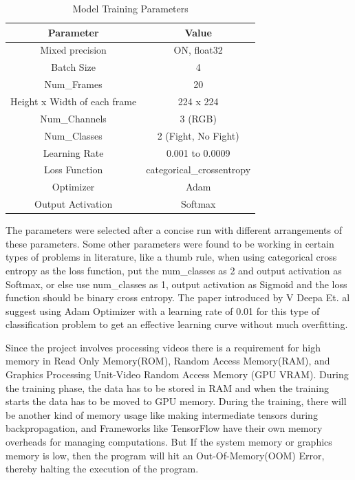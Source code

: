 \begin{table}[!htbp]
\centering
\caption{Model Training Parameters}
\begin{tabular}{c|c}
\hline
\textbf{Parameter}             & \textbf{Value}                 \\ \hline
Mixed precision                & ON, float32                    \\ 
Batch Size                     & 4                              \\ 
Num\_Frames                    & 20                             \\ 
Height x Width of each frame   & 224 x 224                      \\ 
Num\_Channels                  & 3 (RGB)                        \\ 
Num\_Classes                   & 2 (Fight, No Fight)            \\
Learning Rate                  & 0.001 to 0.0009                \\ 
Loss Function                  & categorical\_crossentropy      \\ 
Optimizer                      & Adam                           \\
Output Activation              & Softmax                        \\
\end{tabular}
\label{tab:params}
\end{table}

\noindent The parameters were selected after a concise run with different arrangements of these parameters. Some other parameters were found to be working in certain types of problems in literature, like a thumb rule, when using categorical cross entropy as the loss function, put the num\_classes as 2 and output activation as Softmax, or else use num\_classes as 1, output activation as Sigmoid and the loss function should be binary cross entropy. The paper introduced by V Deepa Et. al \cite{DeepaMisPaper} suggest using Adam Optimizer with a learning rate of 0.01 for this type of classification problem to get an effective learning curve without much overfitting.

\noindent Since the project involves processing videos there is a requirement for high memory in Read Only Memory(ROM), Random Access Memory(RAM), and Graphics Processing Unit-Video Random Access Memory (GPU VRAM). During the training phase, the data has to be stored in RAM and when the training starts the data has to be moved to GPU memory. During the training, there will be another kind of memory usage like making intermediate tensors during backpropagation, and Frameworks like TensorFlow have their own memory overheads for managing computations.  But If the system memory or graphics memory is low, then the program will hit an Out-Of-Memory(OOM) Error, thereby halting the execution of the program.

